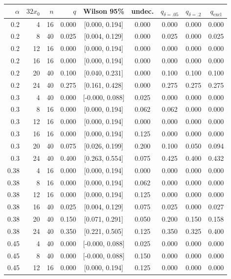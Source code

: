 \begin{tabular}{rrrrccccc}
\toprule
$\alpha$ & $32x_0$ & $n$ & $q$ & Wilson 95\% & undec. & $q_{\delta=.05}$ & $q_{\delta=.2}$ & $q_{\text{excl}}$ \\
\midrule
0.2 & 4 & 16 & 0.000 & [0.000, 0.194] & 0.000 & 0.000 & 0.000 & 0.000 \\
0.2 & 8 & 40 & 0.025 & [0.004, 0.129] & 0.000 & 0.025 & 0.000 & 0.025 \\
0.2 & 12 & 16 & 0.000 & [0.000, 0.194] & 0.000 & 0.000 & 0.000 & 0.000 \\
0.2 & 16 & 16 & 0.000 & [0.000, 0.194] & 0.000 & 0.000 & 0.000 & 0.000 \\
0.2 & 20 & 40 & 0.100 & [0.040, 0.231] & 0.000 & 0.100 & 0.100 & 0.100 \\
0.2 & 24 & 40 & 0.275 & [0.161, 0.428] & 0.000 & 0.275 & 0.275 & 0.275 \\
0.3 & 4 & 40 & 0.000 & [-0.000, 0.088] & 0.025 & 0.000 & 0.000 & 0.000 \\
0.3 & 8 & 16 & 0.000 & [0.000, 0.194] & 0.062 & 0.062 & 0.000 & 0.000 \\
0.3 & 12 & 16 & 0.000 & [0.000, 0.194] & 0.000 & 0.000 & 0.000 & 0.000 \\
0.3 & 16 & 16 & 0.000 & [0.000, 0.194] & 0.125 & 0.000 & 0.000 & 0.000 \\
0.3 & 20 & 40 & 0.075 & [0.026, 0.199] & 0.200 & 0.100 & 0.050 & 0.094 \\
0.3 & 24 & 40 & 0.400 & [0.263, 0.554] & 0.075 & 0.425 & 0.400 & 0.432 \\
0.38 & 4 & 16 & 0.000 & [0.000, 0.194] & 0.000 & 0.000 & 0.000 & 0.000 \\
0.38 & 8 & 16 & 0.000 & [0.000, 0.194] & 0.062 & 0.000 & 0.000 & 0.000 \\
0.38 & 12 & 16 & 0.000 & [0.000, 0.194] & 0.125 & 0.000 & 0.000 & 0.000 \\
0.38 & 16 & 40 & 0.025 & [0.004, 0.129] & 0.075 & 0.025 & 0.000 & 0.027 \\
0.38 & 20 & 40 & 0.150 & [0.071, 0.291] & 0.050 & 0.200 & 0.150 & 0.158 \\
0.38 & 24 & 40 & 0.350 & [0.221, 0.505] & 0.125 & 0.350 & 0.325 & 0.400 \\
0.45 & 4 & 40 & 0.000 & [-0.000, 0.088] & 0.025 & 0.000 & 0.000 & 0.000 \\
0.45 & 8 & 40 & 0.000 & [-0.000, 0.088] & 0.150 & 0.000 & 0.000 & 0.000 \\
0.45 & 12 & 16 & 0.000 & [0.000, 0.194] & 0.125 & 0.000 & 0.000 & 0.000 \\

\end{tabular}
